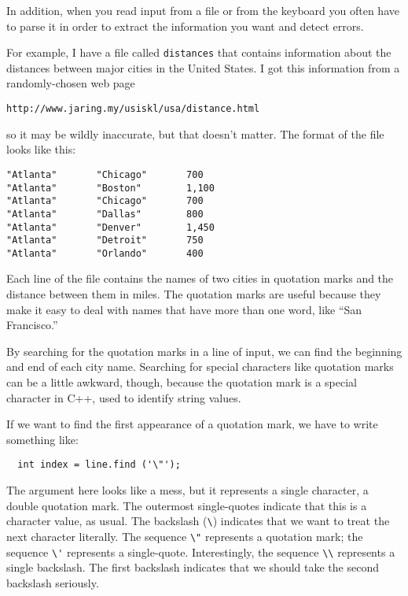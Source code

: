 In addition, when you read input from a file or from the keyboard
you often have to parse it in order to extract the information
you want and detect errors.

For example, I have a file called {\tt distances} that contains
information about the distances between major cities in the
United States.  I got this information from a randomly-chosen
web page

\begin{verbatim}
http://www.jaring.my/usiskl/usa/distance.html
\end{verbatim}
%
so it may be wildly inaccurate, but that doesn't matter.  The
format of the file looks like this:

\begin{verbatim}
"Atlanta"       "Chicago"       700
"Atlanta"       "Boston"        1,100
"Atlanta"       "Chicago"       700
"Atlanta"       "Dallas"        800
"Atlanta"       "Denver"        1,450
"Atlanta"       "Detroit"       750
"Atlanta"       "Orlando"       400
\end{verbatim}
%
Each line of the file contains the names of two cities in quotation
marks and the distance between them in miles.  The quotation marks
are useful because they make it easy to deal with names that have
more than one word, like ``San Francisco.''

By searching for the quotation marks in a line of input, we
can find the beginning and end of each city name.
Searching for special characters like quotation marks can be a little
awkward, though, because the quotation mark is a special character
in C++, used to identify string values.

If we want to find the
first appearance of a quotation mark, we have to write something
like:

\begin{verbatim}
  int index = line.find ('\"');
\end{verbatim}
%
The argument here looks like a mess, but it represents a single
character, a double quotation mark.  The outermost single-quotes
indicate that this is a character value, as usual.  The backslash
(\verb+\+) indicates that we want to treat the next character
literally.  The sequence \verb+\"+ represents a quotation mark; the
sequence \verb+\'+ represents a single-quote.  Interestingly, the
sequence \verb+\\+ represents a single backslash.  The first backslash
indicates that we should take the second backslash seriously.

